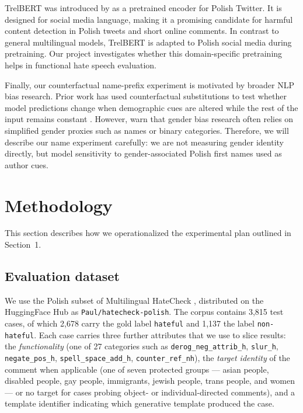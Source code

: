 \documentclass[11pt,a4paper]{article}
\begin{document}
TrelBERT was introduced by \citet{Szmyd2023} as a pretrained encoder for Polish Twitter. It is designed for social media language, making it a promising candidate for harmful content detection in Polish tweets and short online comments. In contrast to general multilingual models, TrelBERT is adapted to Polish social media during pretraining. Our project investigates whether this domain-specific pretraining helps in functional hate speech evaluation.

Finally, our counterfactual name-prefix experiment is motivated by broader NLP bias research. Prior work has used counterfactual substitutions to test whether model predictions change when demographic cues are altered while the rest of the input remains constant \citep{KiritchenkoMohammad2018, Maudslay2019}. However, \citet{Devinney2022} warn that gender bias research often relies on simplified gender proxies such as names or binary categories. Therefore, we will describe our name experiment carefully: we are not measuring gender identity directly, but model sensitivity to gender-associated Polish first names used as author cues.

\section{Methodology}

This section describes how we operationalized the experimental plan outlined in Section~1.

\subsection{Evaluation dataset}

We use the Polish subset of Multilingual HateCheck \citep{Rottger2022}, distributed on the HuggingFace Hub as \texttt{Paul/hatecheck-polish}. The corpus contains 3,815 test cases, of which 2,678 carry the gold label \texttt{hateful} and 1,137 the label \texttt{non-hateful}. Each case carries three further attributes that we use to slice results: the \textit{functionality} (one of 27 categories such as \texttt{derog\_neg\_attrib\_h}, \texttt{slur\_h}, \texttt{negate\_pos\_h}, \texttt{spell\_space\_add\_h}, \texttt{counter\_ref\_nh}), the \textit{target identity} of the comment when applicable (one of seven protected groups --- asian people, disabled people, gay people, immigrants, jewish people, trans people, and women --- or no target for cases probing object- or individual-directed comments), and a template identifier indicating which generative template produced the case.
\end{document}
